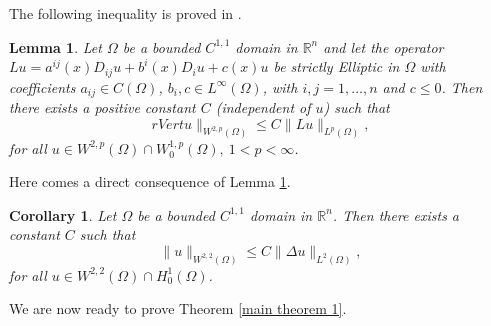\documentclass[10pt,a4paper]{amsart}
\numberwithin{equation}{section}
\newtheorem{lemma}[theorem]{Lemma}
\newtheorem{corollary}[theorem]{Corollary}
\begin{document}
The following inequality is proved in \cite[Lemma 9.17]{DN}.

\begin{lemma} \label{Lu}
Let \(\Omega \) be a bounded \( C^{1,1 }\) domain in \(\mathbb{R}^n\) and let the
operator \(Lu = a^{ij}(x)D_{ij}u+b^i(x)D_iu+c(x)u\)
 be strictly Elliptic in \(\Omega \) with coefficients
 \( a_{ij} \in C(\Omega )\), \(b_i , c \in L^\infty(\Omega) \), with
 \(i, j = 1, \dots, n\) and \(c \leq 0\). Then there
 exists a positive constant \(C\) (independent of \(u\)) such that
\[
 rVert u \rVert_{ W^{2,p}(\Omega)}\leq C \rVert Lu \rVert_{ L^{p}(\Omega)},
\]
for all \(u \in  W^{2,p}(\Omega) \cap W_{0}^{1,p}(\Omega),\  1 < p < \infty\).
\end{lemma}

Here comes a direct consequence of Lemma \ref{Lu}.

\begin{corollary} \label{cor lap}
Let \(\Omega \) be a bounded \( C^{1,1 }\) domain in \(\mathbb{R}^n\).
Then there exists  a constant \(C\) such that
\[
\rVert u \rVert_{ W^{2,2}(\Omega)}\leq C \rVert \Delta u \rVert_{ L^2(\Omega)},
\]
for all \(u \in  W^{2,2}(\Omega) \cap H_0^1(\Omega)\).
\end{corollary}

We are now ready to prove Theorem \ref{main theorem 1}.
\end{document}
